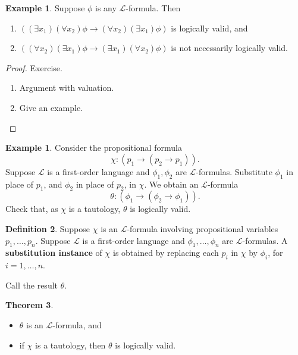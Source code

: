 \documentclass{article}
\renewcommand{\L}{\mathcal{L}}
\newcommand{\rb}[1]{\left( #1 \right)}
\newcommand{\impb}[2]{\rb{#1 \rightarrow #2}}
\newcommand{\fab}[1]{\rb{\forall #1}}
\newcommand{\teb}[1]{\rb{\exists #1}}
\theoremstyle{definition}\newtheorem{definition}{Definition}[subsection]
\theoremstyle{definition}\newtheorem{remark1}[definition]{Remark}
\theoremstyle{definition}\newtheorem{example1}[definition]{Example}
\theoremstyle{definition}\newtheorem*{remark2}{Remark}
\theoremstyle{definition}\newtheorem*{example2}{Example}
\theoremstyle{definition}\newtheorem*{note}{Note}
\theoremstyle{definition}\newtheorem*{notation}{Notation}
\newtheorem{theorem}[definition]{Theorem}
\begin{document}
\pagebreak

\begin{example1}
Suppose $ \phi $ is any $ \L $-formula. Then
\begin{enumerate}
\item $ \impb{\teb{x_1}\fab{x_2}\phi}{\fab{x_2}\teb{x_1}\phi} $ is logically valid, and
\item $ \impb{\fab{x_2}\teb{x_1}\phi}{\teb{x_1}\fab{x_2}\phi} $ is not necessarily logically valid.
\end{enumerate}
\end{example1}

\begin{proof}
Exercise.
\begin{enumerate}
\item Argument with valuation.
\item Give an example.
\end{enumerate}
\end{proof}

\begin{example2}
Consider the propositional formula
$$ \chi : \impb{p_1}{\impb{p_2}{p_1}}. $$
Suppose $ \L $ is a first-order language and $ \phi_1, \phi_2 $ are $ \L $-formulas. Substitute $ \phi_1 $ in place of $ p_1 $, and $ \phi_2 $ in place of $ p_2 $, in $ \chi $. We obtain an $ \L $-formula
$$ \theta : \impb{\phi_1}{\impb{\phi_2}{\phi_1}}. $$
Check that, as $ \chi $ is a tautology, $ \theta $ is logically valid.
\end{example2}

\begin{definition}
Suppose $ \chi $ is an $ \L $-formula involving propositional variables $ p_1, \dots, p_n $. Suppose $ \L $ is a first-order language and $ \phi_1, \dots, \phi_n $ are $ \L $-formulas. A \textbf{substitution instance} of $ \chi $ is obtained by replacing each $ p_i $ in $ \chi $ by $ \phi_i $, for $ i = 1, \dots, n $.
\end{definition}

Call the result $ \theta $.

\begin{theorem}
\hfill
\begin{itemize}
\item $ \theta $ is an $ \L $-formula, and
\item if $ \chi $ is a tautology, then $ \theta $ is logically valid.
\end{itemize}
\end{theorem}
\end{document}
